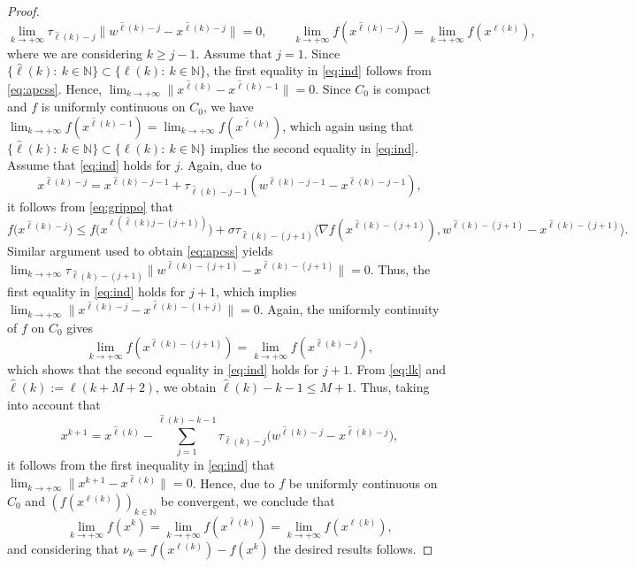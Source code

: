 \begin{proof}
	\begin{equation}\label{eq:ind}
		\lim_{k\to +\infty}  \tau_{{\hat \ell}(k)-j}\|w^{{{\hat \ell}(k)}-j}-x^{{{\hat \ell}(k)}-j}\|=0, \qquad \lim_{k\to +\infty} f(x^{{\hat \ell}(k)-j})= \lim_{k\to +\infty} f(x^{\ell(k)}),
	\end{equation}
	where we are  considering $k\geq j-1$. Assume that $j=1$. Since  $\{{\hat \ell}(k): ~k\in\mathbb{N}\}\subset \{{\ell}(k): ~k\in\mathbb{N}\}$, the first equality in \eqref{eq:ind} follows from \eqref{eq:apcss}. Hence, $\lim_{k\to +\infty} \|x^{{{\hat \ell}(k)}}-x^{{\hat \ell(k)}-1}\|=0$. Since  $C_{0}$ is  compact and  $f$ is uniformly continuous on $C_{0}$, we have $  \lim_{k\to +\infty} f(x^{{\hat \ell}(k)-1})=\lim_{k\to +\infty} f(x^{{\hat \ell(k)}})$, which again using that $\{{\hat \ell}(k): ~k\in\mathbb{N}\}\subset \{{\ell}(k): ~k\in\mathbb{N}\}$ implies the second equality in \eqref{eq:ind}. Assume that \eqref{eq:ind} holds for $j$. Again, due to  
	$$x^{{{\hat \ell}(k)}-j}=x^{{{{\hat \ell}(k)}-j}-1}+ \tau_{{{{\hat \ell}(k)}-j}-1} (w^{{{{\hat \ell}(k)}-j}-1} - x^{{{{\hat \ell}(k)}-j} -1}),$$  
	it follows from \eqref{eq:grippo} that
	$$
		f\big(x^{{{\hat \ell}(k)}-j}\big)  \leq f\big(x^{\ell({{{{\hat \ell}(k)}j}-(j+1)})}\big)+ \sigma \tau_{{{{\hat \ell}(k)}}-(j+1)}\big\langle \nabla f(x^{{{{\hat \ell}(k)}}-(j+1)}), w^{{{{\hat \ell}(k)}}-(j+1)} - x^{{{{\hat \ell}(k)}}-(j+1)} \big\rangle.
	$$
	Similar argument used to obtain \eqref{eq:apcss} yields  $\lim_{k\to +\infty} \tau_{{{{\hat \ell}(k)}}-(j+1)}\|w^{{{{\hat \ell}(k)}}-(j+1)}-x^{{{{\hat \ell}(k)}}-(j+1)}\|=0$. Thus,  the first equality in \eqref{eq:ind} holds for $j+1$, which  implies  $\lim_{k\to +\infty} \|x^{{{\hat \ell}(k)}-j}-x^{{{{\hat \ell}(k)}}-(1+j)}\|=0$.  Again, the   uniformly continuity of $f$ on $C_{0}$ gives
	$$
		\lim_{k\to +\infty} f(x^{{\hat \ell}(k)-(j+1)})=\lim_{k\to +\infty} f(x^{{\hat \ell}(k)-j}),
	$$
	which shows that the second equality in \eqref{eq:ind} holds for $j+1$. From  \eqref{eq:lk}  and ${\hat \ell}(k):=\ell(k+M+2)$, we obtain ${\hat \ell}(k)-k-1\leq M+1$. Thus,  taking into account that
	$$
		x^{k+1}=x^{{\hat \ell}(k)}- \sum_{j=1}^{{\hat \ell}(k)-k-1} \tau_{{\hat \ell}(k)-j} \big(w^{{\hat \ell}(k)-j} - x^{{\hat \ell}(k)-j}\big),
	$$
	it follows from the first inequality in \eqref{eq:ind} that $ \lim_{k\to +\infty} \|x^{k+1}-x^{{\hat \ell}(k)}\|=0$. Hence, due to  $f$ be uniformly continuous on $C_{0}$ and $(f(x^{\ell(k)}))_{k\in\mathbb{N}}$  be convergent,  we conclude that
	$$ \lim_{k\to +\infty} f(x^{k})=\lim_{k\to +\infty} f(x^{{\hat \ell}(k)})= \lim_{k\to +\infty} f(x^{\ell(k)}),$$
	and  considering that $\nu_{k}= f(x^{\ell(k)})-f(x^k)$ the desired results follows.
\end{proof}
